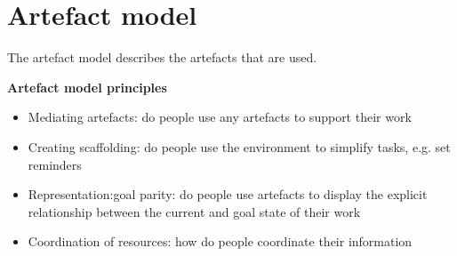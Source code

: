 %
%
%


\section{Artefact model}
The artefact model describes the artefacts that are used. 

\begin{framed}\noindent
\textbf{Artefact model principles}  \\
\begin{itemize}
\item Mediating artefacts: do people use any artefacts to support their work
\item Creating scaffolding: do people use the environment to simplify tasks, e.g. set reminders
\item Representation:goal parity: do people use artefacts to display the explicit relationship between the current and goal state of their work
\item Coordination of resources: how do people coordinate their information
\end{itemize}
\end{framed}


